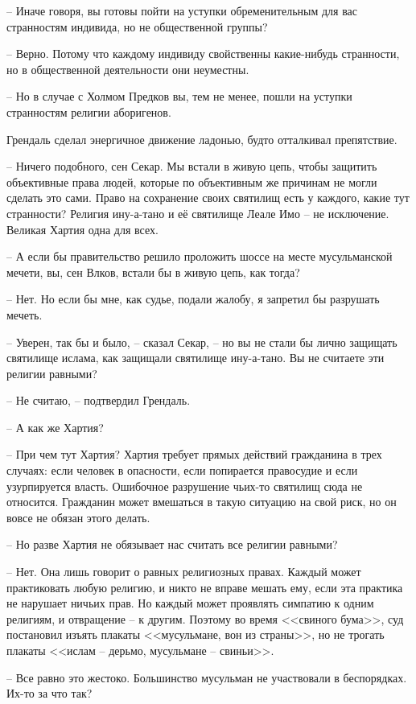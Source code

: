 -- Иначе говоря, вы готовы пойти на уступки обременительным для вас странностям индивида, но не общественной группы?

-- Верно. Потому что каждому индивиду свойственны какие-нибудь странности, но в общественной деятельности они неуместны.

-- Но в случае с Холмом Предков вы, тем не менее, пошли на уступки странностям религии аборигенов.

Грендаль сделал энергичное движение ладонью, будто отталкивал препятствие.

-- Ничего подобного, сен Секар. Мы встали в живую цепь, чтобы защитить объективные права людей, которые по объективным же причинам не могли сделать это сами. Право на сохранение своих святилищ есть у каждого, какие тут странности? Религия ину-а-тано и её святилище Леале Имо -- не исключение. Великая Хартия одна для всех.

-- А если бы правительство решило проложить шоссе на месте мусульманской мечети, вы, сен Влков, встали бы в живую цепь, как тогда?

-- Нет. Но если бы мне, как судье, подали жалобу, я запретил бы разрушать мечеть.

-- Уверен, так бы и было, -- сказал Секар, -- но вы не стали бы лично защищать святилище ислама, как защищали святилище ину-а-тано. Вы не считаете эти религии равными?

-- Не считаю, -- подтвердил Грендаль.

-- А как же Хартия?

-- При чем тут Хартия? Хартия требует прямых действий гражданина в трех случаях: если человек в опасности, если попирается правосудие и если узурпируется власть. Ошибочное разрушение чьих-то святилищ сюда не относится. Гражданин может вмешаться в такую ситуацию на свой риск, но он вовсе не обязан этого делать.

-- Но разве Хартия не обязывает нас считать все религии равными?

-- Нет. Она лишь говорит о равных религиозных правах. Каждый может практиковать любую религию, и никто не вправе мешать ему, если эта практика не нарушает ничьих прав. Но каждый может проявлять симпатию к одним религиям, и отвращение -- к другим. Поэтому во время <<свиного бума>>, суд постановил изъять плакаты <<мусульмане, вон из страны>>, но не трогать плакаты <<ислам -- дерьмо, мусульмане -- свиньи>>.

-- Все равно это жестоко. Большинство мусульман не участвовали в беспорядках. Их-то за что так?

